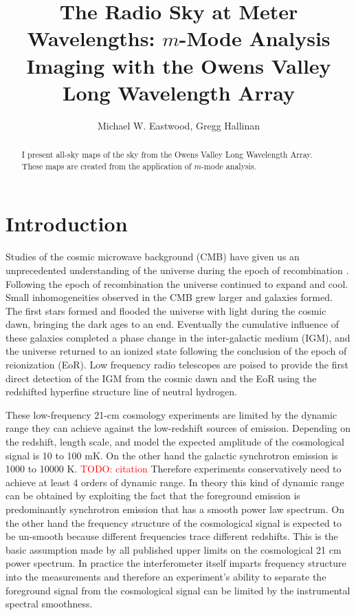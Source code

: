 \documentclass[twocolumn]{aastex6}
\newcommand{\todo}[1]{\textcolor{red}{TODO: #1}\PackageWarning{TODO:}{#1!}}
\begin{document}
\title{The Radio Sky at Meter Wavelengths: $m$-Mode Analysis Imaging with the Owens Valley Long Wavelength Array}

\author{
    Michael W. Eastwood,
    Gregg Hallinan
}

\begin{abstract}
    I present all-sky maps of the sky from the Owens Valley Long Wavelength Array.
    These maps are created from the application of $m$-mode analysis.
\end{abstract}

\section{Introduction}

Studies of the cosmic microwave background (CMB) have given us an unprecedented understanding of the
universe during the epoch of recombination \citep{2013ApJS..208...19H}.  Following the epoch of
recombination the universe continued to expand and cool.  Small inhomogeneities observed in the CMB
grew larger and galaxies formed. The first stars formed and flooded the universe with light during
the cosmic dawn, bringing the dark ages to an end. Eventually the cumulative influence of these
galaxies completed a phase change in the inter-galactic medium (IGM), and the universe returned to
an ionized state following the conclusion of the epoch of reionization (EoR). Low frequency radio
telescopes are poised to provide the first direct detection of the IGM from the cosmic dawn and the
EoR using the redshifted hyperfine structure line of neutral hydrogen.

These low-frequency 21-cm cosmology experiments are limited by the dynamic range they can achieve
against the low-redshift sources of emission. Depending on the redshift, length scale, and model the
expected amplitude of the cosmological signal is 10 to 100 mK. On the other hand the galactic
synchrotron emission is 1000 to 10000 K. \todo{citation} Therefore experiments conservatively need
to achieve at least 4 orders of dynamic range. In theory this kind of dynamic range can be obtained
by exploiting the fact that the foreground emission is predominantly synchrotron emission that has a
smooth power law spectrum. On the other hand the frequency structure of the cosmological signal is
expected to be un-smooth because different frequencies trace different redshifts. This is the basic
assumption made by all published upper limits on the cosmological 21 cm power spectrum.  In practice
the interferometer itself imparts frequency structure into the measurements and therefore an
experiment's ability to separate the foreground signal from the cosmological signal can be limited
by the instrumental spectral smoothness.
\end{document}
